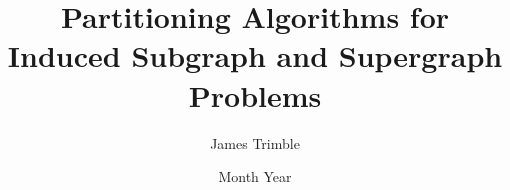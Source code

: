 \documentclass[oneside,hidelinks,nogutter,twoside]{glasgowthesis}
\begin{document}
\pagestyle{empty}

\title{Partitioning Algorithms for Induced Subgraph and Supergraph Problems}
\author{James Trimble}
\date{Month Year}

\maketitle

\cleardoublepage

 

% 

% 

\cleardoublepage
\vspace*{1.75in}








\tableofcontents


\cleardoublepage
\pagestyle{fancy}
\setcounter{page}{1}

\nobibliography*

%
\end{document}

